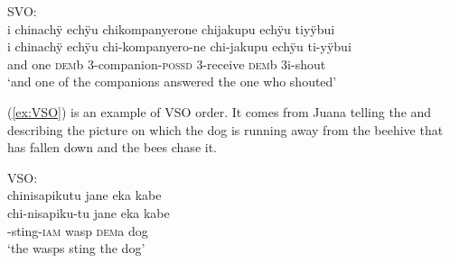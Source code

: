 \ea\label{ex:SVO-2}
\begingl
\glpreamble  \textup{SVO:}\\i chinachÿ echÿu chikompanyerone chijakupu echÿu tiyÿbui\\
\gla i chinachÿ echÿu chi-kompanyero-ne chi-jakupu echÿu ti-yÿbui\\
\glb and one \textsc{dem}b 3-companion-\textsc{possd} 3-receive \textsc{dem}b 3i-shout\\
\glft ‘and one of the companions answered the one who shouted’
\endgl
\trailingcitation{[mxx-n101017s-1.021]}
\xe

%


(\ref{ex:VSO}) is an example of VSO order. It comes from Juana telling the  and describing the picture on which the dog is running away from the beehive that has fallen down and the bees chase it.

\ea\label{ex:VSO}
\begingl 
\glpreamble  \textup{VSO:}\\chinisapikutu jane eka kabe\\
\gla chi-nisapiku-tu jane eka kabe\\ 
-sting-\textsc{iam} wasp \textsc{dem}a dog\\ 
\glft ‘the wasps sting the dog’\\ 
\endgl
\trailingcitation{[jxx-a120516l-a.112]}
\xe


